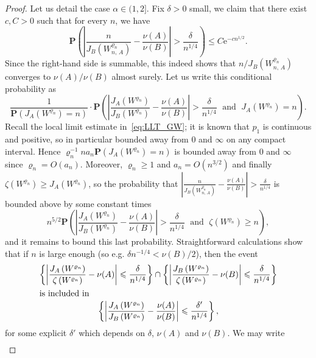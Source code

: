 \documentclass[10pt]{amsart}
\theoremstyle{definition}\newtheorem{defi}[theo]{Definition}\newtheorem{rema}[theo]{Remark}\newtheorem{exam}[theo]{Example}\newtheorem{exem}[theo]{Example}\newtheorem{nota}[theo]{Notation}
\newcommand{\ensembles}[1]{\mathbf{#1}}
\renewcommand{\P}{\ensembles{P}}
\renewcommand{\Pr}[1]{\P\left(#1\right)}
\newcommand{\1}{\ensembles{1}}
\renewcommand{\le}{\leqslant}
\renewcommand{\ge}{\geqslant}
\newcommand{\e}{\mathrm{e}}
\providecommand{\?}{}
\begin{document}
\begin{proof}
Let us detail the case $\alpha \in (1,2]$. Fix $\delta > 0$ small, we claim that there exist $c, C > 0$ such that for every $n$, we have
\begin{equation}\label{eq:concentration_feuilles}
\Pr{\left|\frac{n}{J_B\left(W^{\varrho_n}_{n,\,A}\right)}- \frac{\nu(A)}{\nu(B)}\right| > \frac{\delta}{n^{1/4}}} \le C \e^{- c n^{1/2}}.
\end{equation}
Since the right-hand side is summable, this indeed shows that $n / J_B(W^{\varrho_n}_{n,\,A})$ converges to $\nu(A) / \nu(B)$ almost surely. Let us write this conditional probability as
\[
\frac{1}{\P\left(J_A\left(W^{\varrho_n}\right) = n\right)} \cdot
\Pr{\left|\frac{J_A\left(W^{\varrho_n}\right)}{J_B\left(W^{\varrho_n}\right)}- \frac{\nu(A)}{\nu(B)}\right| > \frac{\delta}{n^{1/4}}\; \text{ and }\;J_A\left(W^{\varrho_n}\right) = n}.
\]
Recall the local limit estimate in~\eqref{eq:LLT_GW}; it is known that $p_1$ is continuous and positive, so in particular bounded away from $0$ and $\infty$ on any compact interval. Hence $\varrho_n^{-1} n a_n \P(J_A(W^{\varrho_n}) = n)$ is bounded away from $0$ and $\infty$ since $\varrho_n = O(a_n)$. Moreover, $\varrho_n \ge 1$ and $a_n = O(n^{3/2})$ and finally $\zeta(W^{\varrho_n}) \ge J_A(W^{\varrho_n})$, so the probability that $|\frac{n}{J_B(W^{\varrho_n}_{n,\,A})}- \frac{\nu(A)}{\nu(B)}| > \frac{\delta}{n^{1/4}}$ is bounded above by some constant times
\[
n^{5/2} \Pr{\left|\frac{J_A\left(W^{\varrho_n}\right)}{J_B\left(W^{\varrho_n}\right)}- \frac{\nu(A)}{\nu(B)}\right| > \frac{\delta}{n^{1/4}}\; \text{ and }\; \zeta\left(W^{\varrho_n}\right) \ge n},
\]
and it remains to bound this last probability. Straightforward calculations show that if $n$ is large enough (so e.g. $\delta n^{-1/4} < \nu(B) / 2$), then the event
\begin{gather*}
\left\{\left|\frac{J_A\left(W^{\varrho_n}\right)}{\zeta\left(W^{\varrho_n}\right)} - \nu(A)\right| \le \frac{\delta}{n^{1/4}}\right\}
\cap \left\{\left|\frac{J_B\left(W^{\varrho_n}\right)}{\zeta\left(W^{\varrho_n}\right)} - \nu(B)\right| \le \frac{\delta}{n^{1/4}}\right\}
\\
\intertext{is included in}
\left\{\left|\frac{J_A\left(W^{\varrho_n}\right)}{J_B\left(W^{\varrho_n}\right)} - \frac{\nu(A)}{\nu(B)}\right| \le \frac{\delta'}{n^{1/4}}\right\},
\end{gather*}
for some explicit $\delta'$ which depends on $\delta$, $\nu(A)$ and $\nu(B)$. We may write
\begin{multline*}

\end{multline*}
\end{proof}
\end{document}

